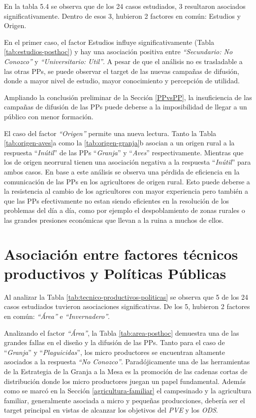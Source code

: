 \documentclass[a4paper, nobind]{templates/ociamthesis}
\begin{document}
En la tabla 5.4 se observa que de los 24 casos estudiados, 3 resultaron asociados significativamente.
Dentro de esos 3, hubieron 2 factores en común: Estudios y Origen.

En el primer caso, el factor Estudios influye significativamente (Tabla \ref{tab:estudios-posthoc}) y hay una asociación positiva entre \emph{``Secundario: No Conozco''} y \emph{``Universitario: Util''}.
A pesar de que el análisis no es trasladable a las otras PPs, se puede observar el target de las nuevas campañas de difusión, donde a mayor nivel de estudio, mayor conocimiento y percepción de utilidad.

Ampliando la conclusión preliminar de la Sección \ref{PPvsPP}, la insuficiencia de las campañas de difusión de las PPs puede deberse a la imposibilidad de llegar a un público con menor formación.

El caso del factor \emph{``Origen''} permite una nueva lectura.
Tanto la Tabla \ref{tab:origen-aves}a como la \ref{tab:origen-granja}b asocian a un origen rural a la respuesta ``\emph{Inútil}'' de las PPs ``\emph{Granja}'' y ``\emph{Aves}'' respectivamente.
Mientras que los de origen neorrural tienen una asociación negativa a la respuesta ``\emph{Inútil}'' para ambos casos.
En base a este análisis se observa una pérdida de eficiencia en la comunicación de las PPs en los agricultores de origen rural.
Esto puede deberse a la resistencia al cambio de los agricultores con mayor experiencia pero también a que las PPs efectivamente no estan siendo eficientes en la resolución de los problemas del día a día, como por ejemplo el despoblamiento de zonas rurales o las grandes presiones económicas que llevan a la ruina a muchos de ellos.

\hypertarget{asociaciuxf3n-entre-factores-tuxe9cnicos-productivos-y-poluxedticas-puxfablicas}{%
\section{Asociación entre factores técnicos productivos y Políticas Públicas}\label{asociaciuxf3n-entre-factores-tuxe9cnicos-productivos-y-poluxedticas-puxfablicas}}

Al analizar la Tabla \ref{tab:tecnico-productivos-politicas} se observa que 5 de los 24 casos estudiados tuvieron asociaciones significativas.
De los 5, hubieron 2 factores en común: \emph{``Área''} e \emph{``Invernadero''}.

Analizando el factor \emph{``Área''}, la Tabla \ref{tab:area-posthoc} demuestra una de las grandes fallas en el diseño y la difusión de las PPs.
Tanto para el caso de ``\emph{Granja}'' y ``\emph{Plaguicidas}'', los micro productores se encuentran altamente asociados a la respuesta \emph{``No Conozco''}.
Paradójicamente una de las herramientas de la Estrategia de la Granja a la Mesa es la promoción de las cadenas cortas de distribución donde los micro productores juegan un papel fundamental.
Además como se marcó en la Sección \ref{agricultura-familiar} el campesinado y la agricultura familiar, generalmente asociada a micro y pequeñas producciones, debería ser el target principal en vistas de alcanzar los objetivos del \emph{PVE} y los \emph{ODS}.
\end{document}
